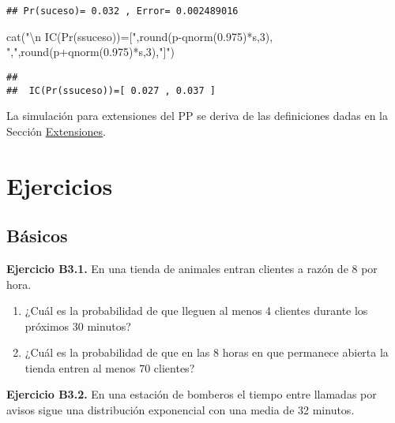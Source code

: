 \documentclass[
]{book}
\newenvironment{Shaded}{\begin{snugshade}}{\end{snugshade}}
\newcommand{\DecValTok}[1]{\textcolor[rgb]{0.00,0.00,0.81}{#1}}
\newcommand{\FloatTok}[1]{\textcolor[rgb]{0.00,0.00,0.81}{#1}}
\newcommand{\FunctionTok}[1]{\textcolor[rgb]{0.00,0.00,0.00}{#1}}
\newcommand{\NormalTok}[1]{#1}
\newcommand{\SpecialCharTok}[1]{\textcolor[rgb]{0.00,0.00,0.00}{#1}}
\newcommand{\StringTok}[1]{\textcolor[rgb]{0.31,0.60,0.02}{#1}}
\providecommand{\tightlist}{%
  \setlength{\itemsep}{0pt}\setlength{\parskip}{0pt}}
\theoremstyle{definition}
\theoremstyle{definition}
\theoremstyle{definition}
\theoremstyle{definition}
\theoremstyle{remark}
\begin{document}
\begin{verbatim}
## Pr(suceso)= 0.032 , Error= 0.002489016
\end{verbatim}

\begin{Shaded}
\begin{Highlighting}[]
\FunctionTok{cat}\NormalTok{(}\StringTok{"}\SpecialCharTok{\textbackslash{}n}\StringTok{ IC(Pr(ssuceso))=["}\NormalTok{,}\FunctionTok{round}\NormalTok{(p}\SpecialCharTok{{-}}\FunctionTok{qnorm}\NormalTok{(}\FloatTok{0.975}\NormalTok{)}\SpecialCharTok{*}\NormalTok{s,}\DecValTok{3}\NormalTok{), }\StringTok{","}\NormalTok{,}\FunctionTok{round}\NormalTok{(p}\SpecialCharTok{+}\FunctionTok{qnorm}\NormalTok{(}\FloatTok{0.975}\NormalTok{)}\SpecialCharTok{*}\NormalTok{s,}\DecValTok{3}\NormalTok{),}\StringTok{"]"}\NormalTok{)}
\end{Highlighting}
\end{Shaded}

\begin{verbatim}
## 
##  IC(Pr(ssuceso))=[ 0.027 , 0.037 ]
\end{verbatim}

La simulación para extensiones del PP se deriva de las definiciones dadas en la Sección \href{extensiones_pp}{Extensiones}.

\hypertarget{ejer-u3}{%
\section{Ejercicios}\label{ejer-u3}}

\hypertarget{buxe1sicos-2}{%
\subsection{Básicos}\label{buxe1sicos-2}}

\textbf{Ejercicio B3.1.} En una tienda de animales entran clientes a razón de 8 por hora.

\begin{enumerate}
\def\labelenumi{\arabic{enumi}.}
\tightlist
\item
  ¿Cuál es la probabilidad de que lleguen al menos 4 clientes durante los próximos 30 minutos?
\item
  ¿Cuál es la probabilidad de que en las 8 horas en que permanece abierta la tienda entren al menos 70 clientes?
\end{enumerate}

\textbf{Ejercicio B3.2.} En una estación de bomberos el tiempo entre llamadas por avisos sigue una distribución exponencial con una media de 32 minutos.
\end{document}

